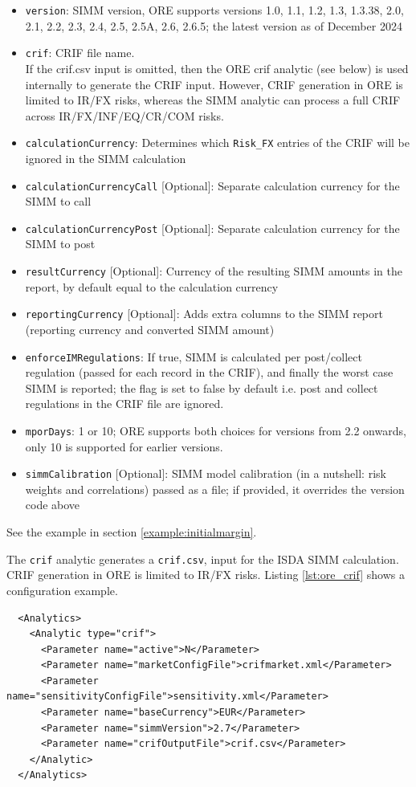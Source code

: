 \begin{itemize}
\item {\tt version}: SIMM version, ORE supports versions 1.0, 1.1, 1.2, 1.3, 1.3.38, 2.0, 2.1, 2.2, 2.3, 2.4, 2.5, 2.5A, 2.6, 2.6.5; the latest version as of December 2024
\item {\tt crif}: CRIF file name. \\
  If the crif.csv input is omitted, then the ORE crif analytic (see below) is used internally to generate the CRIF input.
  However, CRIF generation in ORE is limited to IR/FX risks, whereas the SIMM analytic can process a full CRIF across
  IR/FX/INF/EQ/CR/COM risks.
\item {\tt calculationCurrency}: Determines which {\tt Risk\_FX} entries of the CRIF will be ignored
  in the SIMM calculation
\item {\tt calculationCurrencyCall} [Optional]: Separate calculation currency for the SIMM to call
\item {\tt calculationCurrencyPost} [Optional]: Separate calculation currency for the SIMM to post
\item {\tt resultCurrency} [Optional]: Currency of the resulting SIMM amounts in the report, by default equal to the calculation currency
\item {\tt reportingCurrency} [Optional]: Adds extra columns to the SIMM report (reporting currency and converted SIMM amount)
\item {\tt enforceIMRegulations}: If true, SIMM is calculated per post/collect regulation (passed for each record in the CRIF), and finally the worst case SIMM is reported; the flag is set to false by default i.e. post and collect regulations in the CRIF file are ignored.
\item {\tt mporDays}: 1 or 10; ORE supports both choices for versions from 2.2 onwards, only 10 is supported for earlier versions.
\item {\tt simmCalibration} [Optional]: SIMM model calibration (in a nutshell: risk weights and correlations) passed as a file; if provided, it overrides the version code above
\end{itemize}

See the example in section \ref{example:initialmargin}.

\medskip
The {\tt crif} analytic generates a {\tt crif.csv}, input for the ISDA SIMM calculation.
CRIF generation in ORE is limited to IR/FX risks.
Listing \ref{lst:ore_crif} shows a configuration example.

\begin{listing}[H]
\begin{verbatim}
  <Analytics>
    <Analytic type="crif">
      <Parameter name="active">N</Parameter>
      <Parameter name="marketConfigFile">crifmarket.xml</Parameter>
      <Parameter name="sensitivityConfigFile">sensitivity.xml</Parameter>
      <Parameter name="baseCurrency">EUR</Parameter>
      <Parameter name="simmVersion">2.7</Parameter>
      <Parameter name="crifOutputFile">crif.csv</Parameter>
    </Analytic>
  </Analytics>
\end{verbatim}
\caption{ORE analytic: CRIF Generation}
\label{lst:ore_crif}
\end{listing}

